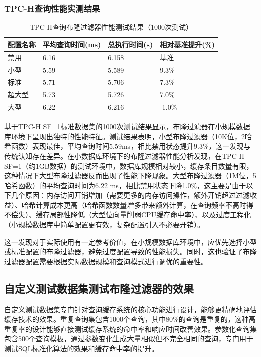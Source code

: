 \subsubsection{TPC-H查询性能实测结果}

\begin{table}[!htb]
    \caption{TPC-H查询布隆过滤器性能测试结果（1000次测试）}
    \label{table3_6}
    \centering
    \begin{tabular}{p{3cm}p{4cm}p{3cm}p{4cm}}
        \hline
        配置名称 & 平均查询时间(ms) & 总执行时间(s) & 相对基准提升(\%) \\
        \hline
        禁用 & 6.16 & 6.158 & 基准 \\
        小型 & 5.59 & 5.589 & 9.3\% \\
        标准 & 5.71 & 5.706 & 7.3\% \\
        超大型 & 5.73 & 5.726 & 7.0\% \\
        大型 & 6.22 & 6.216 & -1.0\% \\
        \hline
    \end{tabular}
\end{table}

基于TPC-H SF=1标准数据集的1000次测试结果显示，布隆过滤器在小规模数据库环境下呈现出独特的性能特征。测试结果表明，小型布隆过滤器（10K位，2哈希函数）表现最佳，平均查询时间5.59ms，相比禁用状态提升9.3\%，这一发现与传统认知存在差异。在小数据库环境下的布隆过滤器性能分析发现，在TPC-H SF=1（约1GB数据）的测试环境中，数据库规模相对较小，缓存条目数量有限，这种情况下大型布隆过滤器反而出现了性能下降现象。大型布隆过滤器（1M位，5哈希函数）的平均查询时间为6.22 ms，相比禁用状态下降1.0\%，这主要是由于以下几个原因：内存访问开销增加（需要更多的内存访问操作，额外开销超过过滤收益）、哈希计算成本更高（哈希函数数量增多带来额外计算，在查询频率不高时得不偿失）、缓存局部性降低（大型位向量削弱CPU缓存命中率）、以及过度工程化（小规模数据库中简单配置更有效，复杂配置引入不必要开销）。

这一发现对于实际使用有一定参考价值，在小规模数据库环境中，应优先选择小型或标准配置的布隆过滤器，避免过度配置导致的性能损失。同时，这也验证了布隆过滤器配置需要根据实际数据规模和查询模式进行调优的重要性。

\subsection{自定义测试数据集测试布隆过滤器的效果}
自定义测试数据集专门针对查询缓存系统的核心功能进行设计，能够更精确地评估缓存技术的效果。重复查询集包含1000个查询，其中80\%的查询是重复的，这种高重复率的设计能够直接测试缓存系统的命中率和响应时间改善效果。参数化查询集包含500个查询模板，通过参数变化生成大量相似但不完全相同的查询，专门用于测试SQL标准化算法的效果和缓存命中率的提升。

